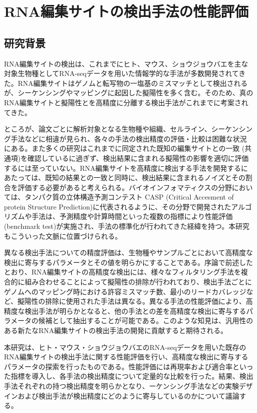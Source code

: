 \chapter{RNA編集サイトの検出手法の性能評価}
\section{研究背景}
RNA編集サイトの検出は、これまでにヒト、マウス、ショウジョウバエを主な対象生物種としてRNA-seqデータを用いた情報学的な手法が多数開発されてきた。RNA編集サイトはゲノムと転写物の一塩基のミスマッチとして検出されるが、シーケンシングやマッピングに起因した擬陽性を多く含む。そのため、真のRNA編集サイトと擬陽性とを高精度に分離する検出手法がこれまでに考案されてきた。
\par
ところが、論文ごとに解析対象となる生物種や組織、セルライン、シーケンシング手法などに相違が見られ、各々の手法の検出精度の評価・比較は困難な状況にある。また多くの研究はこれまでに同定された既知の編集サイトとの一致 (共通項)を確認しているに過ぎず、検出結果に含まれる擬陽性の影響を適切に評価するには至っていない。RNA編集サイトを高精度に検出する手法を開発するにあたっては、既知の結果との一致と同時に、検出結果に含まれるノイズとその割合を評価する必要があると考えられる。バイオインフォマティクスの分野においては、タンパク質の立体構造予測コンテスト CASP (Critical Accesment of protein Structure Prediction)に代表されるように、その分野で開発されたアルゴリズムや手法は、予測精度や計算時間といった複数の指標により性能評価 (benchmark test)が実施され、手法の標準化が行われてきた経緯を持つ。本研究もこういった文脈に位置づけられる。
\par
異なる検出手法についての精度評価は、生物種やサンプルごとにおいて高精度な検出に寄与するパラメータとその値を明らかにすることである。序論で前述したとおり、RNA編集サイトの高精度な検出には、様々なフィルタリング手法を複合的に組み合わせることによって擬陽性の排除が行われており、検出手法ごとにゲノムへのマッピング時における許容ミスマッチ数、最小のリードカバレッジなど、擬陽性の排除に使用された手法は異なる。異なる手法の性能評価により、高精度な検出手法が明らかとなると、他の手法との差を高精度な検出に寄与するパラメータの候補として抽出することが可能である。このような知見は、汎用性のある新たなRNA編集サイトの検出手法の開発に貢献すると期待される。
\par
本研究は、ヒト・マウス・ショウジョウバエのRNA-seqデータを用いた既存のRNA編集サイトの検出手法に関する性能評価を行い、高精度な検出に寄与するパラメータの探索を行ったものである。性能評価には再現率および適合率といった指標を導入し、各手法の検出精度について定量的な比較を行った。結果、検出手法それぞれの持つ検出精度を明らかとなり、ーケンシング手法などの実験デザインおよび検出手法が検出精度にどのように寄与しているのかについて議論する。

